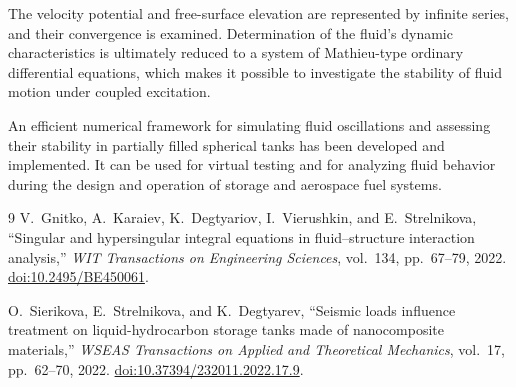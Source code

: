 The velocity potential and free-surface elevation are represented by infinite series, and their convergence is examined. Determination of the fluid's dynamic characteristics is ultimately reduced to a system of Mathieu-type ordinary differential equations, which makes it possible to investigate the stability of fluid motion under coupled excitation.

An efficient numerical framework for simulating fluid oscillations and assessing their stability in partially filled spherical tanks has been developed and implemented. It can be used for virtual testing and for analyzing fluid behavior during the design and operation of storage and aerospace fuel systems.

\begin{thebibliography}{9}
V.~Gnitko, A.~Karaiev, K.~Degtyariov, I.~Vierushkin, and E.~Strelnikova,
``Singular and hypersingular integral equations in fluid--structure interaction analysis,''
\emph{WIT Transactions on Engineering Sciences}, vol.~134, pp.~67--79, 2022.
\href{https://doi.org/10.2495/BE450061}{doi:10.2495/BE450061}.

O.~Sierikova, E.~Strelnikova, and K.~Degtyarev,
``Seismic loads influence treatment on liquid-hydrocarbon storage tanks made of nanocomposite materials,''
\emph{WSEAS Transactions on Applied and Theoretical Mechanics}, vol.~17, pp.~62--70, 2022.
\href{https://doi.org/10.37394/232011.2022.17.9}{doi:10.37394/232011.2022.17.9}.
\end{thebibliography}
